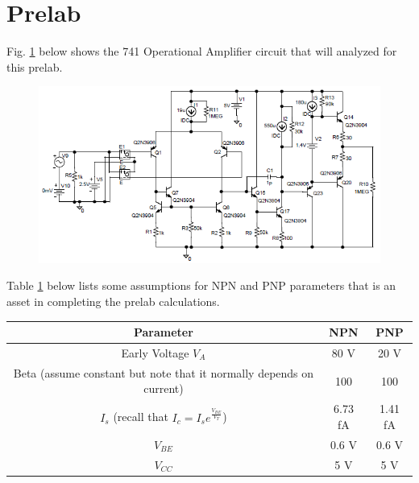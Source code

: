 \documentclass{article}
\begin{document}
	\pagebreak
	\section{Prelab}
	Fig. \ref{f:1} below shows the 741 Operational Amplifier circuit that will analyzed for this prelab.
	\begin{figure}[!ht]
		\centering
		\includegraphics[width=0.7\textheight]{741_op-amp.png}
		\label{f:1}
	\end{figure}

	\noindent Table \ref{t:1} below lists some assumptions for NPN and PNP parameters that is an asset in completing the prelab calculations.
	\begin{table}[!ht]
		\centering
		\begin{tabular}{|c|c|c|}
			\hline
			\textbf{Parameter} & \textbf{NPN} & \textbf{PNP}\\
			\hline\hline
			Early Voltage $V_A$ & 80 V & 20 V\\
			\hline
			Beta (assume constant but note that it normally depends on current) & 100 & 100\\
			\hline
			$I_s$ (recall that $I_c = I_s e^{\frac{V_{BE}}{V_T}}$) & 6.73 fA & 1.41 fA\\
			\hline
			$V_{BE}$ & 0.6 V & 0.6 V\\
			\hline
			$V_{CC}$ & 5 V & 5 V\\
			\hline			
		\end{tabular}
		\label{t:1}
	\end{table}

	\pagebreak
\end{document}
